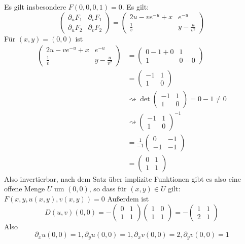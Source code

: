 \documentclass[sectionformat=aufgabe]{gadsescript}
\begin{document}
Es gilt insbesondere $ F(0, 0, 0, 1) = 0 $.
Es gilt:
\[
	\begin{pmatrix} 
		\partial_u F_1 & \partial_v F_1 \\
		\partial_u F_2 & \partial_v F_2
	\end{pmatrix} 
	=
	\begin{pmatrix} 
		2u - v e^{-u} + x & e^{-u} \\
		\frac{ 1 }{ v } & y - \frac{ u }{ v^2 } 
	\end{pmatrix} 
\]
Für $ (x, y) = (0, 0) $ ist
\begin{align*}
	\begin{pmatrix} 
		2u - v e^{-u} + x & e^{-u} \\
		\frac{ 1 }{ v } & y - \frac{ u }{ v^2 } 
	\end{pmatrix} 
	&=
	\begin{pmatrix}
		0 - 1 + 0 & 1 \\
		1 & 0 - 0
	\end{pmatrix} \\
	&=
	\begin{pmatrix} -1 & 1\\ 1 & 0 \end{pmatrix} \\
	&\rightsquigarrow
	\det \begin{pmatrix} -1 & 1 \\ 1 & 0 \end{pmatrix} = 0 - 1 \neq 0\\
	~&\rightsquigarrow
	\begin{pmatrix} -1 & 1\\ 1 & 0 \end{pmatrix} ^{-1} \\
	&=
	\frac{ 1 }{ -1 } \begin{pmatrix} 0 & -1\\ -1 & -1 \end{pmatrix} \\
	~&=
	\begin{pmatrix} 0 & 1\\ 1 & 1 \end{pmatrix}
\end{align*}
Also invertierbar, nach dem Satz über implizite Funktionen gibt es also eine offene Menge $ U $ um $ (0, 0) $, so dass für $ (x, y) \in U $ gilt: $ F(x, y, u(x, y), v(x, y)) = 0 $
Außerdem ist
\[
	D(u, v)(0, 0) = - \begin{pmatrix} 0 & 1 \\ 1 & 1 \end{pmatrix} \begin{pmatrix} 1 & 0 \\ 1 & 1 \end{pmatrix} = - \begin{pmatrix} 1 & 1 \\ 2 & 1 \end{pmatrix} 
\]
Also
\[
	\partial_x u (0, 0) = 1, \partial_y u(0, 0) = 1, \partial_x v (0, 0) = 2, \partial_y v (0, 0) = 1
\]
\end{document}
